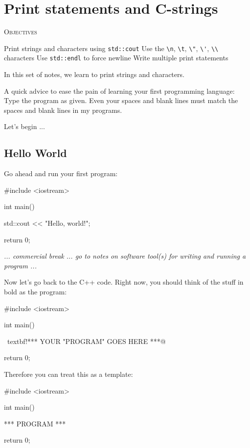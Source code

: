 \chapter{Print statements and C-strings}


\textsc{Objectives}
\begin{tightlist}
\li Print strings and characters using \verb!std::cout!
\li Use the \verb!\n!, \verb!\t!, \verb!\"!, \verb!\'!, 
    \verb!\\! characters
\li Use \verb!std::endl! to force newline
\li Write multiple print statements
\end{tightlist}
In this set of notes, we learn to print strings and characters.

A quick advice to ease the pain of learning your first programming language: 
Type the program 
 as given. 
Even your spaces and blank lines must match the spaces 
and blank lines in my programs.

Let's begin ...


\newpage\section{Hello World}

Go ahead and run your first program:
\begin{console}
#include <iostream>

int main()
{
    std::cout << "Hello, world!\n";

    return 0;
}
\end{console}

{\it ... commercial break ... go to notes on software tool(s) for writing and 
running a program ...}

Now let's go back to the C++ code. Right now, you should think of the stuff in bold as the program:
\begin{console}[commandchars=\~\!\@]
#include <iostream>

int main()
{
    ~textbf!*** YOUR "PROGRAM" GOES HERE ***@

    return 0;
}
\end{console}


Therefore you can treat this as a template:


\begin{console}[commandchars=\~\!\@]
#include <iostream>

int main()
{

    *** PROGRAM ***

    return 0;
}
\end{console}

